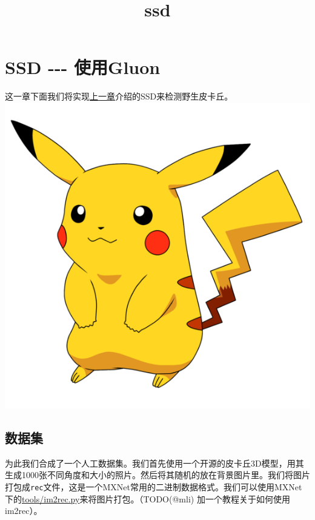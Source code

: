 \documentclass[11pt]{article}
\title{ssd}
\makeatletter
\def\maxwidth{\ifdim\Gin@nat@width>\linewidth\linewidth
    \else\Gin@nat@width\fi}
\let\Oldincludegraphics\includegraphics
\renewcommand{\includegraphics}[1]{\Oldincludegraphics[width=.8\maxwidth]{#1}}
\makeatother
\begin{document}
    
    
    \maketitle
    
    

    
    \section{SSD -\/-\/- 使用Gluon}\label{ssd-----ux4f7fux7528gluon}

这一章下面我们将实现\href{./object-detection.md}{上一章}介绍的SSD来检测野生皮卡丘。
\includegraphics{../img/pikachu.png}

\subsection{数据集}\label{ux6570ux636eux96c6}

为此我们合成了一个人工数据集。我们首先使用一个开源的皮卡丘3D模型，用其生成1000张不同角度和大小的照片。然后将其随机的放在背景图片里。我们将图片打包成\texttt{rec}文件，这是一个MXNet常用的二进制数据格式。我们可以使用MXNet下的\href{https://github.com/apache/incubator-\%20mxnet/blob/master/tools/im2rec.py}{tools/im2rec.py}来将图片打包。（TODO(@mli)
加一个教程关于如何使用im2rec）。
\end{document}

